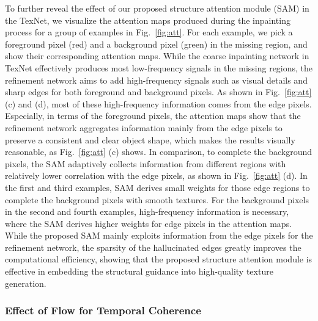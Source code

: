 To further reveal the effect of our proposed structure attention module (SAM) in the TexNet, we visualize the attention maps produced during the inpainting process for a group of examples in Fig.~\ref{fig:att}.
For each example, we pick a foreground pixel (red) and a background pixel (green) in the missing region, and show their corresponding attention maps.
%
While the coarse inpainting network in TexNet effectively produces most low-frequency signals in the missing regions, the refinement network aims to add high-frequency signals such as visual details and sharp edges for both foreground and background pixels.
%
As shown in Fig.~\ref{fig:att} (c) and (d), most of these high-frequency information comes from the edge pixels.
%
Especially, in terms of the foreground pixels, the attention maps show that the refinement network aggregates information mainly from the edge pixels to preserve a consistent and clear object shape, which makes the results visually reasonable, as Fig.~\ref{fig:att} (c) shows.
In comparison, to complete the background pixels, the SAM adaptively collects information from different regions with relatively lower correlation with the edge pixels, as shown in Fig.~\ref{fig:att} (d).
%
In the first and third examples, SAM derives small weights for those edge regions to complete the background pixels with smooth textures. 
For the background pixels in the second and fourth examples, high-frequency information is necessary, where the SAM derives higher weights for edge pixels in the attention maps.  
%
While the proposed SAM mainly exploits information from the edge pixels for the refinement network, the sparsity of the hallucinated edges greatly improves the computational efficiency, showing that the proposed structure attention module is effective in embedding the structural guidance into high-quality texture generation.








\subsubsection{Effect of Flow for Temporal Coherence}

